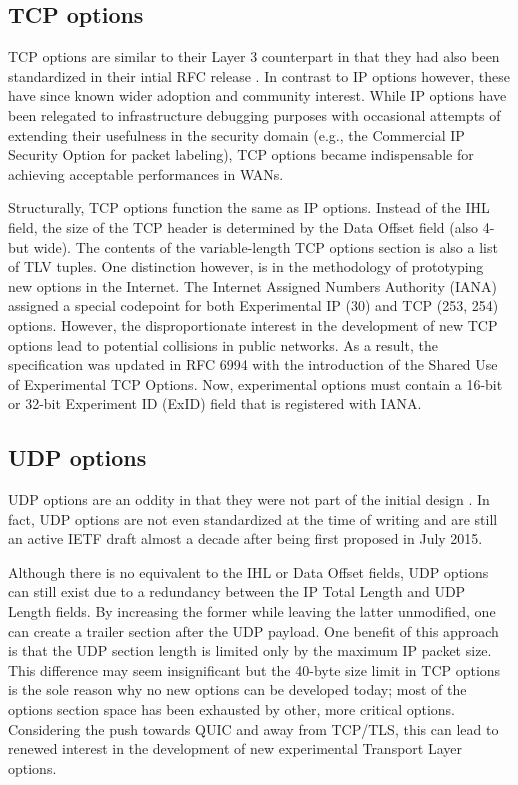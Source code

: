 \subsection{TCP options}

TCP options are similar to their Layer 3 counterpart in that they had also been
standardized in their intial RFC release \cite{rfc793}. In contrast to IP options
however, these have since known wider adoption and community interest. While IP
options have been relegated to infrastructure debugging purposes with occasional
attempts of extending their usefulness in the security domain (e.g., the
Commercial IP Security Option for packet labeling), TCP options became
indispensable for achieving acceptable performances in WANs.

Structurally, TCP options function the same as IP options. Instead of the IHL
field, the size of the TCP header is determined by the Data Offset field (also
4-but wide). The contents of the variable-length TCP options section is also a
list of TLV tuples. One distinction however, is in the methodology of
prototyping new options in the Internet. The Internet Assigned Numbers Authority
(IANA) assigned a special codepoint for both Experimental IP (30) and TCP (253,
254) options. However, the disproportionate interest in the development of new
TCP options lead to potential collisions in public networks. As a result, the
specification was updated in RFC 6994 with the introduction of the Shared Use of
Experimental TCP Options. Now, experimental options must contain a 16-bit or
32-bit Experiment ID (ExID) field that is registered with IANA.

\subsection{UDP options}

UDP options are an oddity in that they were not part of the initial design
\cite{postel1980rfc0768}. In fact, UDP options are not even standardized at the
time of writing and are still an active IETF draft almost a decade after being
first proposed in July 2015.

Although there is no equivalent to the IHL or Data Offset fields, UDP options
can still exist due to a redundancy between the IP Total Length and UDP Length
fields. By increasing the former while leaving the latter unmodified, one can
create a trailer section after the UDP payload. One benefit of this approach is
that the UDP section length is limited only by the maximum IP packet size. This
difference may seem insignificant but the 40-byte size limit in TCP options is
the sole reason why no new options can be developed today; most of the options
section space has been exhausted by other, more critical options. Considering
the push towards QUIC \cite{langley2017quic} and away from TCP/TLS, this can
lead to renewed interest in the development of new experimental Transport Layer
options.

